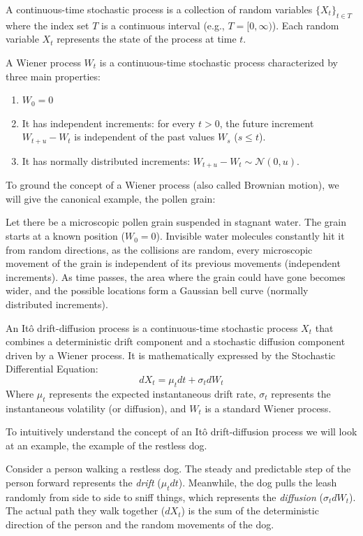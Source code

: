 \begin{definition}
A continuous-time stochastic process is a collection of random variables \(\{X_t\}_{t \in T}\) where the index set \(T\) is a continuous interval (e.g., \(T = [0, \infty)\)). Each random variable \(X_t\) represents the state of the process at time \(t\).
\end{definition}

\begin{definition}
A Wiener process \(W_t\) is a continuous-time stochastic process characterized by three main properties:
\begin{enumerate}
    \item \(W_0 = 0\)
    \item It has independent increments: for every \(t > 0\), the future increment \(W_{t+u} - W_t\) is independent of the past values \(W_s\) (\(s \le t\)).
    \item It has normally distributed increments: \(W_{t+u} - W_t \sim \mathcal{N}(0, u)\).
\end{enumerate}
\end{definition}
To ground the concept of a Wiener process (also called Brownian motion), we will give the canonical example, the pollen grain:
\begin{example}
    Let there be a microscopic pollen grain suspended in stagnant water. The grain starts at a known position (\(W_0 = 0\)). Invisible water molecules constantly hit it from random directions, as the collisions are random, every microscopic movement of the grain is independent of its previous movements (independent increments). As time passes, the area where the grain could have gone becomes wider, and the possible locations form a Gaussian bell curve (normally distributed increments).
\end{example}

\begin{definition}
An Itô drift-diffusion process is a continuous-time stochastic process \(X_t\) that combines a deterministic drift component and a stochastic diffusion component driven by a Wiener process. It is mathematically expressed by the Stochastic Differential Equation:
\[
    dX_t = \mu_t dt + \sigma_t dW_t
\]
Where \(\mu_t\) represents the expected instantaneous drift rate, \(\sigma_t\) represents the instantaneous volatility (or diffusion), and \(W_t\) is a standard Wiener process.
\end{definition}
    To intuitively understand the concept of an Itô drift-diffusion process we will look at an example, the example of the restless dog.
\begin{example}
    Consider a person walking a restless dog. The steady and predictable step of the person forward represents the \textit{drift} (\(\mu_t dt\)). Meanwhile, the dog pulls the leash randomly from side to side to sniff things, which represents the \textit{diffusion} (\(\sigma_t dW_t\)). The actual path they walk together (\(dX_t\)) is the sum of the deterministic direction of the person and the random movements of the dog.
\end{example}

